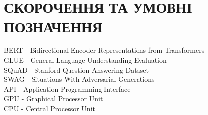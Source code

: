 \chapter*{СКОРОЧЕННЯ ТА УМОВНІ ПОЗНАЧЕННЯ}
\noindent
BERT - Bidirectional Encoder Representations from Transformers\\
GLUE - General Language Understanding Evaluation\\
SQuAD - Stanford Question Answering Dataset\\
SWAG - Situations With Adversarial Generations\\
API - Application Programming Interface\\
GPU - Graphical Processor Unit\\
CPU - Central Processor Unit\\
